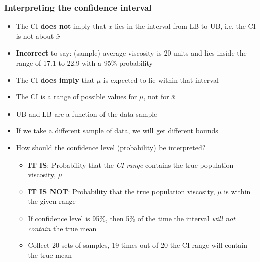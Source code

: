 \begin{frame}\frametitle{Interpreting the confidence interval}
	\begin{itemize}
		\item	The CI \textbf{does not} imply that $\bar{x}$ lies in the interval from LB to UB, i.e. the CI is not about $\bar{x}$
		\item	\textbf{Incorrect} to say: (sample) average viscosity is 20 units and lies inside the range of 17.1 to 22.9 with a 95\% probability
		\item	The CI \textbf{does imply} that $\mu$ is expected to lie within that interval
		\item	The CI is a range of possible values for $\mu$, not for $\bar{x}$ 
		\item	UB and LB are a function of the data sample
		\item	If we take a different sample of data, we will get different bounds
		\item	How should the confidence level (probability) be interpreted?
		\begin{itemize}
			\item	\textbf{IT IS}: Probability that the \emph{CI range} contains the true population viscosity, $\mu$
			\item	\textbf{IT IS NOT}: Probability that the true population viscosity, $\mu$ is within the given range
			\item	If confidence level is 95\%, then 5\% of the time the interval \emph{will not contain} the true mean
			\item	Collect 20 sets of samples, 19 times out of 20 the CI range will contain the true mean
		\end{itemize}
	\end{itemize}
\end{frame}

